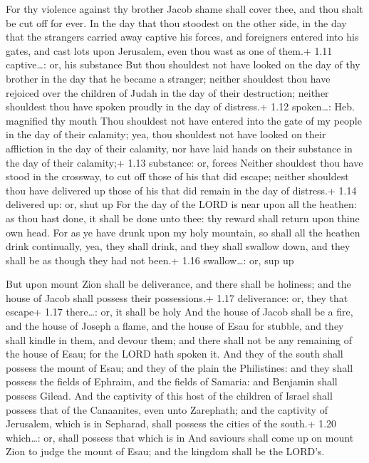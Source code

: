  For thy violence against thy brother Jacob shame shall
cover thee, and thou shalt be cut off for ever.  In the day
that thou stoodest on the other side, in the day that the strangers
carried away captive his forces, and foreigners entered into his gates,
and cast lots upon Jerusalem, even thou wast as one of them.+ 1.11
captive\ldots: or, his substance  But thou shouldest not
have looked on the day of thy brother in the day that he became a
stranger; neither shouldest thou have rejoiced over the children of
Judah in the day of their destruction; neither shouldest thou have
spoken proudly in the day of distress.+ 1.12 spoken\ldots: Heb.
magnified thy mouth  Thou shouldest not have entered into
the gate of my people in the day of their calamity; yea, thou shouldest
not have looked on their affliction in the day of their calamity, nor
have laid hands on their substance in the day of their calamity;+ 1.13
substance: or, forces  Neither shouldest thou have stood in
the crossway, to cut off those of his that did escape; neither shouldest
thou have delivered up those of his that did remain in the day of
distress.+ 1.14 delivered up: or, shut up  For the day of
the LORD is near upon all the heathen: as thou hast done, it shall be
done unto thee: thy reward shall return upon thine own head.
 For as ye have drunk upon my holy mountain, so shall all
the heathen drink continually, yea, they shall drink, and they shall
swallow down, and they shall be as though they had not been.+ 1.16
swallow\ldots: or, sup up

 But upon mount Zion shall be deliverance, and there
shall be holiness; and the house of Jacob shall possess their
possessions.+ 1.17 deliverance: or, they that escape+ 1.17 there\ldots:
or, it shall be holy  And the house of Jacob shall be a
fire, and the house of Joseph a flame, and the house of Esau for
stubble, and they shall kindle in them, and devour them; and there shall
not be any remaining of the house of Esau; for the LORD hath spoken it.
 And they of the south shall possess the mount of Esau; and
they of the plain the Philistines: and they shall possess the fields of
Ephraim, and the fields of Samaria: and Benjamin shall possess Gilead.
 And the captivity of this host of the children of Israel
shall possess that of the Canaanites, even unto Zarephath; and the
captivity of Jerusalem, which is in Sepharad, shall possess the cities
of the south.+ 1.20 which\ldots: or, shall possess that which is in
 And saviours shall come up on mount Zion to judge the
mount of Esau; and the kingdom shall be the LORD's.
